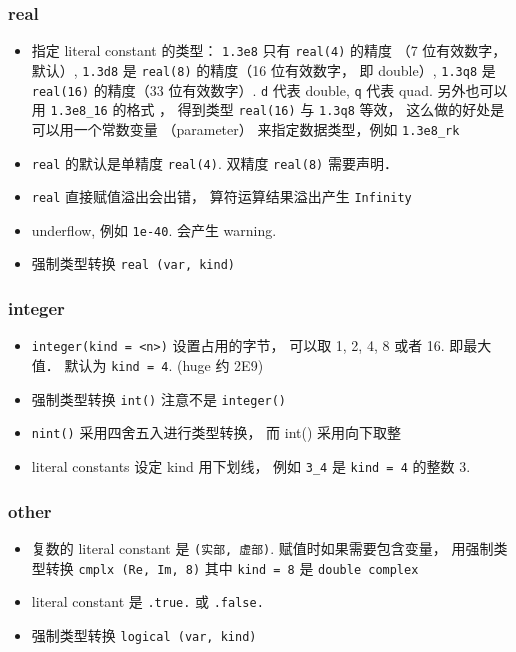 \subsubsection{real}
\begin{itemize}
\item 指定 literal constant 的类型： \verb|1.3e8| 只有 \verb|real(4)| 的精度 （7 位有效数字， 默认）, \verb|1.3d8| 是 \verb|real(8)| 的精度（16 位有效数字， 即 double）, \verb|1.3q8| 是 \verb|real(16)| 的精度（33 位有效数字）. \verb|d| 代表 double, \verb|q| 代表 quad. 另外也可以用 \verb|1.3e8_16| 的格式 ， 得到类型  \verb|real(16)| 与 \verb|1.3q8| 等效， 这么做的好处是可以用一个常数变量 （parameter） 来指定数据类型，例如 \verb|1.3e8_rk|
\item \verb|real| 的默认是单精度 \verb|real(4)|. 双精度 \verb|real(8)| 需要声明．
\item \verb|real| 直接赋值溢出会出错， 算符运算结果溢出产生 \verb|Infinity|
\item underflow, 例如 \verb|1e-40|. 会产生 warning.
\item 强制类型转换 \verb|real (var, kind)|
\end{itemize}

\subsubsection{integer}
\begin{itemize}
\item \verb`integer(kind = <n>)` 设置占用的字节， 可以取 1, 2, 4, 8 或者 16. 即最大值． 默认为 
   \verb|kind = 4|. (huge 约 2E9)
\item 强制类型转换 \verb|int()| 注意不是 \verb|integer()|
\item \verb`nint()` 采用四舍五入进行类型转换， 而 int() 采用向下取整
\item literal constants 设定 kind 用下划线， 例如 \verb`3_4` 是 \verb`kind = 4` 的整数 3.
\end{itemize}

\subsubsection{other}
\begin{itemize}
\item 复数的 literal constant 是 \verb|(实部, 虚部)|. 赋值时如果需要包含变量， 用强制类型转换 \verb|cmplx (Re, Im, 8)| 其中 \verb|kind = 8| 是 \verb|double complex|
\item literal constant 是 \verb|.true.| 或 \verb|.false.|
\item 强制类型转换 \verb|logical (var, kind)|
\end{itemize}

